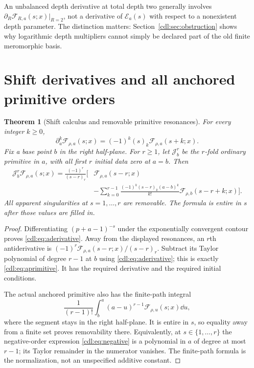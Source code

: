 \documentclass[11pt,letterpaper]{article}
\numberwithin{equation}{section}
\newtheorem{theorem}{Theorem}[section]
\theoremstyle{definition}\newtheorem{definition}[theorem]{Definition}
\theoremstyle{remark}\newtheorem{remark}[theorem]{Remark}
\newcommand{\F}{\mathcal F}\newcommand{\E}{\mathcal E}
\begin{document}
An unbalanced depth derivative at total depth two generally involves
$\partial_R\F_{R,a}(s;x)|_{R=2}$, not a derivative of $\E_a(s)$ with
respect to a nonexistent depth parameter. The distinction matters:
Section~\ref{cdl:sec:obstruction} shows why logarithmic depth multipliers
cannot simply be declared part of the old finite meromorphic basis.

\section{Shift derivatives and all anchored primitive orders}
\label{cdl:sec:primitives}

\begin{theorem}[Shift calculus and removable primitive resonances]
\label{cdl:thm:primitives}
For every integer $k\ge0$,
\begin{equation}\label{cdl:eq:aderivative}
 \partial_a^k\F_{\rho,a}(s;x)=(-1)^k(s)_k\F_{\rho,a}(s+k;x).
\end{equation}
Fix a base point $b$ in the right half-plane. For $r\ge1$, let
$\mathcal J_b^r$ be the $r$-fold ordinary primitive in $a$, with all
first $r$ initial data zero at $a=b$. Then
\begin{equation}\label{cdl:eq:aprimitive}
 \begin{split}
 \mathcal J_b^r\F_{\rho,a}(s;x)
 =\frac{(-1)^r}{(s-r)_r}\biggl[&\F_{\rho,a}(s-r;x)\\
 &-\sum_{k=0}^{r-1}\frac{(-1)^k(s-r)_k(a-b)^k}{k!}
             \F_{\rho,b}(s-r+k;x)\biggr].
 \end{split}
\end{equation}
All apparent singularities at $s=1,\ldots,r$ are removable. The formula
is entire in $s$ after those values are filled in.
\end{theorem}
\begin{proof}
Differentiating $(p+a-1)^{-s}$ under the exponentially convergent
contour proves \eqref{cdl:eq:aderivative}. Away from the displayed
resonances, an $r$th antiderivative is
$(-1)^r\F_{\rho,a}(s-r;x)/(s-r)_r$.
Subtract its Taylor polynomial of degree $r-1$ at $b$ using
\eqref{cdl:eq:aderivative}; this is exactly \eqref{cdl:eq:aprimitive}.
It has the required derivative and the required initial conditions.

The actual anchored primitive also has the finite-path integral
\[
 \frac1{(r-1)!}\int_b^a(a-u)^{r-1}\F_{\rho,u}(s;x)\dd u,
\]
where the segment stays in the right half-plane. It is entire in $s$,
so equality away from a finite set proves removability there. Equivalently,
at $s\in\{1,\ldots,r\}$ the negative-order expression
\eqref{cdl:eq:negative} is a polynomial in $a$ of degree at most $r-1$;
its Taylor remainder in the numerator vanishes. The finite-path formula
is the normalization, not an unspecified additive constant.
\end{proof}
\end{document}
